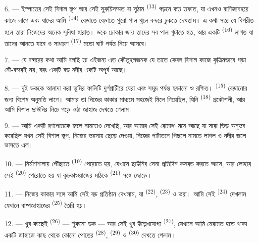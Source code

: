6. --- ইস্পাতের সেই বিশাল স্তূপ আর সেই সুরুচিসম্মত  বা
সুঠাম  \textsuperscript{(13)} গড়নে কত তফাত, যা এখনও
বাণিজ্যবহরে কাজে লাগে এবং যাদের আমি  \textsuperscript{(14)}
বেড়াতে বেড়াতে পুরো পাল খুলে বন্দরে ঢুকতে দেখতাম। এ কথা সত্য যে
 বিপরীত হলে তারা নিজেদের অনেক সুবিধা হারাত। ডকে ঢোকার জন্য
তাদের সব পাল গুটাতে হত, আর একটি  \textsuperscript{(16)} লাগত
যা তাদের আনতে যাবে ও সাধারণ  \textsuperscript{(17)} মতো
ঘাট পর্যন্ত নিয়ে আসবে।

\VUsaut{3.0mm}
\VUsaut{3.0mm}

7. --- যে বন্দরের কথা আমি বলছি তা এইজন্য এত কৌতূহলজনক যে তাতে কেবল বিশাল
কাজে কৃত্রিমভাবে গড়া নৌ-বন্দরই নয়, বরং একটি বড় নদীর  একটি
অপূর্ব  আছে।

8. --- দুই ডককে আলাদা করা ভূমির ফালিটি দুর্গপ্রাচীরে ঘেরা এবং সমুদ্র পর্যন্ত
ছড়ানো  ও  রক্ষিত। 
\textsuperscript{(15)} বেড়ানোর জন্য বিশেষ অনুমতি লাগে। আমার তা নিজের কাকার
মাধ্যমে সহজেই মিলে গিয়েছিল, যিনি 
\textsuperscript{(18)} প্রকৌশলী, আর আমি বিশাল ছাউনির নিচে গড়ে ওঠা জাহাজ দেখতে
গেলাম।

9. --- আমি একটি রণপোতকে জলে নামতেও দেখেছি, আর আমার সেই রোমাঞ্চ মনে আছে যা
সারা ভিড় অনুভব করেছিল যখন সেই বিশাল স্তূপ, নিজের ভরসায় ছেড়ে দেওয়া, নিজের
পাটাতনে পিছলে নামতে লাগল ও নদীর জলে ভাসতে এল।

10. --- নির্মাণশালায় পৌঁছাতে  \textsuperscript{(19)}
পেরোতে হয়, যেখানে ছাউনির সেনা প্রতিদিন কসরত করতে আসে, আর লোহার সেই
 \textsuperscript{(20)} পেরোতে হয় যা কুচকাওয়াজের মাঠকে
 \textsuperscript{(21)} সঙ্গে জোড়ে।

\VUsaut{3.0mm}
\VUsaut{3.0mm}

11. --- নিজের কাকার সঙ্গে আমি সেই বড় প্রতিষ্ঠান দেখলাম, যা 
\textsuperscript{(22)},  \textsuperscript{(23)} ও 
ভরা। আমি সেই  \textsuperscript{(24)} দেখলাম যেখানে বাষ্পজাহাজের
 \textsuperscript{(25)} তৈরি হয়।

12. --- খুব কাছেই  \textsuperscript{(26)} --- শুকনো ডক --- আর সেই খুব
উল্লেখযোগ্য  \textsuperscript{(27)}, যেখানে আমি মেরামত হতে থাকা
একটি জাহাজে কাছ থেকে কোনো পোতের  \textsuperscript{(28)},
 \textsuperscript{(29)} ও  \textsuperscript{(30)} দেখতে
পেলাম।

